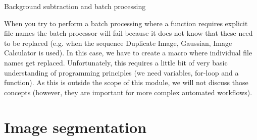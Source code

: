 \begin{taskbox}{Background subtraction and batch processing}
\begin{enumerate}
		\begin{minipage}[t]{\linewidth}
		\begin{center}
		\medskip
		\label{fig:batch-process-dialog}
		\end{center}
	\end{minipage}
	
	\end{enumerate}
\end{taskbox}

When you try to perform a batch processing where a function requires explicit file names the batch processor will fail because it does not know that these need to be replaced (e.g. when the sequence Duplicate Image, Gaussian, Image Calculator is used). In this case, we have to create a macro where individual file names get replaced. Unfortunately, this requires a little bit of very basic understanding of programming principles (we need variables, for-loop and a function). As this is outside the scope of this module, we will not discuss those concepts (however, they are important for more complex automated workflows). 

\section{Image segmentation}

